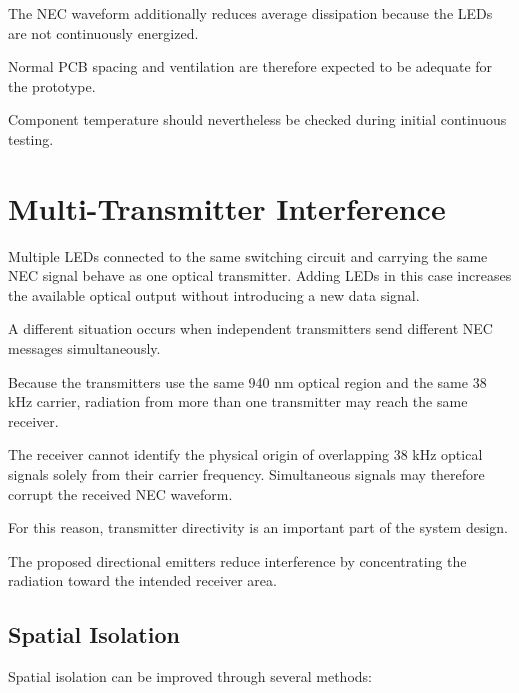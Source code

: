 \documentclass[a4paper,12pt]{article}
\begin{document}
The NEC waveform additionally reduces average dissipation because the
LEDs are not continuously energized.

Normal PCB spacing and ventilation are therefore expected to be
adequate for the prototype.

Component temperature should nevertheless be checked during initial
continuous testing.



\section{Multi-Transmitter Interference}

Multiple LEDs connected to the same switching circuit and carrying the
same NEC signal behave as one optical transmitter. Adding LEDs in this
case increases the available optical output without introducing a new
data signal.

A different situation occurs when independent transmitters send
different NEC messages simultaneously.

Because the transmitters use the same 940 nm optical region and the
same 38 kHz carrier, radiation from more than one transmitter may reach
the same receiver.

The receiver cannot identify the physical origin of overlapping
38 kHz optical signals solely from their carrier frequency.
Simultaneous signals may therefore corrupt the received NEC waveform.

For this reason, transmitter directivity is an important part of the
system design.

The proposed directional emitters reduce interference by concentrating
the radiation toward the intended receiver area.



\subsection{Spatial Isolation}

Spatial isolation can be improved through several methods:
\end{document}
